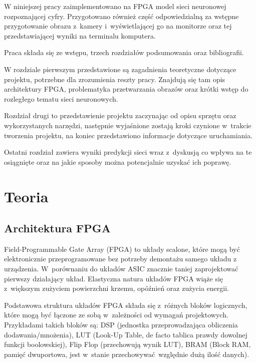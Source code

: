 \documentclass[12pt, oneside, a4paper]{article}
\begin{document}
W niniejszej pracy zaimplementowano na FPGA model sieci neuronowej rozpoznającej
cyfry. Przygotowano również część odpowiedzialną za wstępne przygotowanie
obrazu z~kamery i~wyświetlającej go na monitorze oraz tej przedstawiającej
wyniki na terminalu komputera.

Praca składa się ze wstępu, trzech rozdziałów podsumowania oraz bibliografii.

W rozdziale pierwszym przedstawione są zagadnienia teoretyczne dotyczące
projektu, potrzebne dla zrozumienia reszty pracy. Znajdują się tam opis
architektury FPGA, problematyka przetwarzania obrazów oraz krótki wstęp
do rozległego tematu sieci neuronowych.

Rozdział drugi to przedstawienie projektu zaczynając od opisu
sprzętu oraz wykorzystanych narzędzi, następnie wyjaśnione zostają kroki
czynione w~trakcie tworzenia projektu, na koniec przedstawiono informacje
dotyczące uruchamiania.

Ostatni rozdział zawiera wyniki predykcji sieci wraz z~dyskusją co wpływa
na te osiągnięte oraz na jakie sposoby można potencjalnie uzyskać ich poprawę.

\restoregeometry{}

\newpage
\section{Teoria}\label{sec:Teoria}
\subsection{Architektura FPGA}\label{sec:Architektura FPGA}
Field-Programmable Gate Array (FPGA) to układy scalone, które mogą być
elektronicznie przeprogramowane bez potrzeby demontażu samego układu
z urządzenia. W~porównaniu do układów ASIC znacznie taniej zaprojektować
pierwszy działający układ. Elastyczna natura układów FPGA wiąże się z~większym
zużyciem powierzchni krzemu, opóźnień oraz zużycia energii.\cite{kuon08}

Podstawowa struktura układów FPGA składa się z~różnych bloków logicznych,
które mogą być łączone ze sobą w~zależności od wymagań projektowych.
Przykładami takich bloków są:
DSP (jednostka przeprowadzająca obliczenia dodawania/mnożenia),
LUT (Look-Up Table, de facto tablica prawdy dowolnej funkcji boolowskiej),
Flip Flop (przechowują wynik LUT), BRAM (Block RAM, pamięć dwuportowa,
jest w~stanie przechowywać względnie dużą ilość danych).
\end{document}

